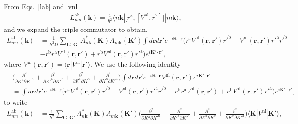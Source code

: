 \documentclass[floatfix,prb,aps,superscriptaddress,showpacs,11pt,preprint,letterpaper]{revtex4}
\begin{document}
From Eqs.~\eqref{lab} and \eqref{vnl} 
\begin{align}\label{3.1}
L^{\mathrm{a}\mathrm{b}}_{nm}(\mathbf{k}) 
=
\frac{1}{\hbar^2}
\langle n\mathbf{k} |
\big[ r^{\mathrm{a}},[ V^\mathrm{nl}, r^\mathrm{b}]\big]
| m\mathbf{k}\rangle
,
\end{align} 
and we expand the triple commutator to obtain,
\begin{align}\label{3.5}
L^{\mathrm{a}\mathrm{b}}_{nm}(\mathbf{k}) 
&=
\frac{1}{\hbar^2\Omega}
\sum_{\mathbf{G},\mathbf{G}'} 
A^*_{n\mathbf{k}}(\mathbf{K}) 
A_{m\mathbf{k}}(\mathbf{K}')
\int
d\mathbf{r} d\mathbf{r}'
 e^{-i\mathbf{K}\cdot\mathbf{r}}
\Big(
r^{\mathrm{a}}
V^\mathrm{nl}(\mathbf{r},\mathbf{r}')
r'^\mathrm{b}
-
V^\mathrm{nl}(\mathbf{r},\mathbf{r}')
r'^\mathrm{a}
r'^{\mathrm{b}}
\nonumber\\
&-
r^\mathrm{b}
r^{\mathrm{a}}
V^\mathrm{nl}(\mathbf{r},\mathbf{r}')
+
 r^\mathrm{b}
V^\mathrm{nl}(\mathbf{r},\mathbf{r}')
r'^{\mathrm{a}}
\Big) 
 e^{i\mathbf{K}'\cdot\mathbf{r}'}
,
\end{align} 
where 
$V^\mathrm{nl}(\mathbf{r},\mathbf{r}') = \langle\mathbf{r} | V^\mathrm{nl} | \mathbf{r}'\rangle$.
We use the following identity
\begin{align}\label{3.4}
&
\Big(
\frac{\partial^2}{\partial K^\mathrm{a}\partial K'^\mathrm{b}}
+
\frac{\partial^2}{\partial K'^\mathrm{a}\partial K'^\mathrm{b}}
+
\frac{\partial^2}{\partial K^\mathrm{a}\partial K^\mathrm{b}}
+
\frac{\partial^2}{\partial K^\mathrm{b}\partial K'^\mathrm{a}}
\Big)
\int 
d\mathbf{r} d\mathbf{r}' 
 e^{-i\mathbf{K}\cdot\mathbf{r}}
V^\mathrm{nl}(\mathbf{r},\mathbf{r}') 
e^{i\mathbf{K}'\cdot\mathbf{r}'}
\nonumber\\
&=
\int d\mathbf{r} d\mathbf{r}'
 e^{-i\mathbf{K}\cdot\mathbf{r}}
\Big( 
r^{\mathrm{a}} 
V^\mathrm{nl}(\mathbf{r},\mathbf{r}') 
r'^\mathrm{b}
- 
V^\mathrm{nl}(\mathbf{r},\mathbf{r}') 
r'^\mathrm{a} 
r'^{\mathrm{b}}
- 
r^\mathrm{b} 
r^{\mathrm{a}} 
V^\mathrm{nl}(\mathbf{r},\mathbf{r}')
+
 r^\mathrm{b} 
V^\mathrm{nl}(\mathbf{r},\mathbf{r}') 
r'^{\mathrm{a}}
\Big)  
e^{i\mathbf{K}'\cdot\mathbf{r}'}
,
\end{align}
to write
\begin{align}\label{3.7}
L^{\mathrm{a}\mathrm{b}}_{nm}(\mathbf{k})
&=
\frac{1}{\hbar^2}
\sum_{\mathbf{G},\mathbf{G}'} 
A^*_{n\mathbf{k}}(\mathbf{K}) 
A_{m\mathbf{k}}(\mathbf{K}')
\Big(
\frac{\partial^2}{\partial K^\mathrm{a}\partial K'^\mathrm{b}}
+
\frac{\partial^2}{\partial K'^\mathrm{a}\partial K'^\mathrm{b}}
+
\frac{\partial^2}{\partial K^\mathrm{a}\partial K^\mathrm{b}}
+
\frac{\partial^2}{\partial K^\mathrm{b}\partial K'^\mathrm{a}}
\Big)
\langle \mathbf{K} |
V^\mathrm{nl} 
| \mathbf{K}'\rangle, 
\nonumber\\
\end{align} 
\end{document}
